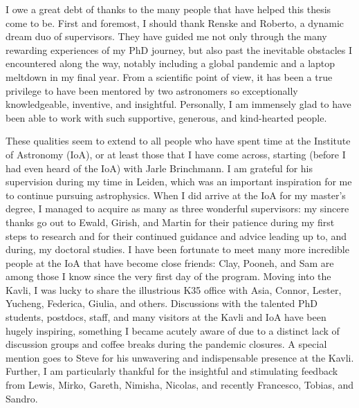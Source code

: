 
\begin{acknowledgements}      
    
    I owe a great debt of thanks to the many people that have helped this thesis come to be. First and foremost, I should thank Renske and Roberto, a dynamic dream duo of supervisors. They have guided me not only through the many rewarding experiences of my PhD journey, but also past the inevitable obstacles I encountered along the way, notably including a global pandemic and a laptop meltdown in my final year. From a scientific point of view, it has been a true privilege to have been mentored by two astronomers so exceptionally knowledgeable, inventive, and insightful. Personally, I am immensely glad to have been able to work with such supportive, generous, and kind-hearted people.
    
    These qualities seem to extend to all people who have spent time at the Institute of Astronomy (IoA), or at least those that I have come across, starting (before I had even heard of the IoA) with Jarle Brinchmann. I am grateful for his supervision during my time in Leiden, which was an important inspiration for me to continue pursuing astrophysics. When I did arrive at the IoA for my master's degree, I managed to acquire as many as three wonderful supervisors: my sincere thanks go out to Ewald, Girish, and Martin for their patience during my first steps to research and for their continued guidance and advice leading up to, and during, my doctoral studies. I have been fortunate to meet many more incredible people at the IoA that have become close friends: Clay, Pooneh, and Sam are among those I know since the very first day of the program. Moving into the Kavli, I was lucky to share the illustrious K35 office with Asia, Connor, Lester, Yucheng, Federica, Giulia, and others. Discussions with the talented PhD students, postdocs, staff, and many visitors at the Kavli and IoA have been hugely inspiring, something I became acutely aware of due to a distinct lack of discussion groups and coffee breaks during the pandemic closures. A special mention goes to Steve for his unwavering and indispensable presence at the Kavli. Further, I am particularly thankful for the insightful and stimulating feedback from Lewis, Mirko, Gareth, Nimisha, Nicolas, and recently Francesco, Tobias, and Sandro.
    

\end{acknowledgements}
